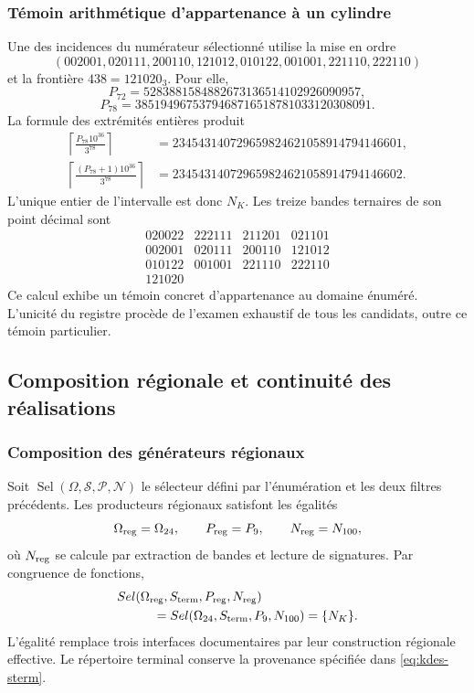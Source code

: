 \subsubsection{Témoin arithmétique d'appartenance à un cylindre}

Une des incidences du numérateur sélectionné utilise la mise en ordre
\[
 (002001,020111,200110,121012,010122,001001,221110,222110)
\]
et la frontière $438=121020_3$. Pour elle,
\[
 P_{72}=5283881584882673136514102926090957,
\]
\[
 P_{78}=3851949675379468716518781033120308091.
\]
La formule des extrémités entières produit
\begin{align*}
 \left\lceil\frac{P_{78}10^{36}}{3^{78}}\right\rceil
 &=234543140729659824621058914794146601,\\
 \left\lceil\frac{(P_{78}+1)10^{36}}{3^{78}}\right\rceil
 &=234543140729659824621058914794146602.
\end{align*}
L'unique entier de l'intervalle est donc $N_K$. Les treize bandes ternaires de son point décimal sont
\[
 \begin{array}{rrrr}
 020022&222111&211201&021101\\
 002001&020111&200110&121012\\
 010122&001001&221110&222110\\
 121020&&&
 \end{array}
\]
Ce calcul exhibe un témoin concret d'appartenance au domaine énuméré. L'unicité du registre procède de l'examen exhaustif de tous les candidats, outre ce témoin particulier.

\subsection{Composition régionale et continuité des réalisations}

\subsubsection{Composition des générateurs régionaux}

Soit $\operatorname{Sel}(\Omega,\mathcal S,\mathcal P,\mathcal N)$ le
sélecteur défini par l'énumération et les deux filtres précédents.
Les producteurs régionaux satisfont les égalités
\[
 \Omega_{\rm reg}=\Omega_{24},\qquad
 \mathcal P_{\rm reg}=\mathcal P_9,\qquad
 \mathcal N_{\rm reg}=\mathcal N_{100},
\]
où $\mathcal N_{\rm reg}$ se calcule par extraction de bandes et
lecture de signatures. Par congruence de fonctions,
\begin{equation}
 \begin{split}
 &\operatorname{Sel}(\Omega_{\rm reg},\mathcal S_{\rm term},
                    \mathcal P_{\rm reg},\mathcal N_{\rm reg})\\
 &\hspace{10mm}=
 \operatorname{Sel}(\Omega_{24},\mathcal S_{\rm term},
                    \mathcal P_9,\mathcal N_{100})=\{N_K\}.
 \end{split}
 \label{eq:kdes-composicion}
\end{equation}
L'égalité remplace trois interfaces documentaires par leur construction
régionale effective. Le répertoire terminal conserve la provenance
spécifiée dans \eqref{eq:kdes-sterm}.

